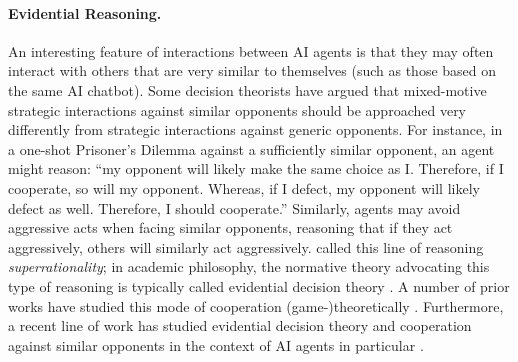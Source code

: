 \paragraph{Evidential Reasoning.} An interesting feature of interactions between AI agents is that they may often interact with others that are very similar to themselves (such as those based on the same AI chatbot).
Some decision theorists have argued that mixed-motive strategic interactions against similar opponents should be approached very differently from strategic interactions against generic opponents.
For instance, in a one-shot Prisoner's Dilemma against a sufficiently similar opponent, an agent might reason: ``my opponent will likely make the same choice as I. Therefore, if I cooperate, so will my opponent. Whereas, if I defect, my opponent will likely defect as well. Therefore, I should cooperate.'' \citep{Brams1975,Lewis1979,Hofstadter1983} Similarly, agents may avoid aggressive acts when facing similar opponents, reasoning that if they act aggressively, others will similarly act aggressively. \citet{Hofstadter1983} called this line of reasoning \textit{superrationality}; in academic philosophy, the normative theory advocating this type of reasoning is typically called evidential decision theory \citep{ahmed2014evidence}. A number of prior works have studied this mode of cooperation (game-)theoretically \citep{roemer2010kantian,spohn2007dependency,daley2017magical,halpern2018game}. %
Furthermore, a recent line of work has studied evidential decision theory and cooperation against similar opponents in the context of AI agents in particular \citep{Albert2001,Meyer2016,Bell2021NewcombRL,OesterheldApprovalDirected,Barasz2014,oesterheld2024similarity,oesterheld2024dataset}.






